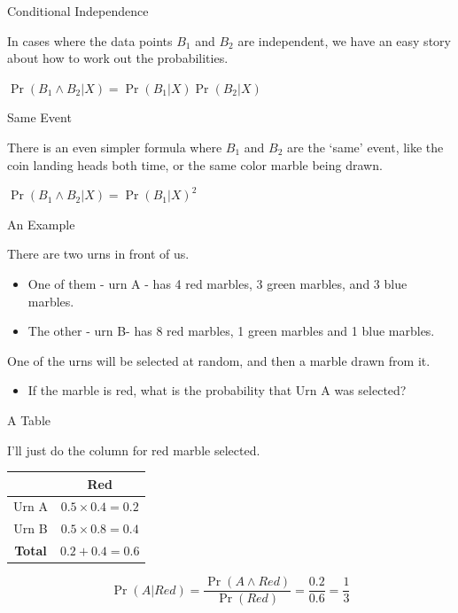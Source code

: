 \documentclass[
  ignorenonframetext,
]{beamer}
\providecommand{\tightlist}{%
  \setlength{\itemsep}{0pt}\setlength{\parskip}{0pt}}
\renewcommand{\,}{\text{, }}
\renewenvironment*{quote}	
	{\list{}{\rightmargin   \leftmargin} \item } 	
	{\endlist }
\begin{document}
\begin{frame}{Conditional Independence}
\protect\hypertarget{conditional-independence-1}{}

In cases where the data points \(B_1\) and \(B_2\) are independent, we
have an easy story about how to work out the probabilities.

\begin{quote}
\(\Pr(B_1 \wedge B_2 | X) = \Pr(B_1 | X)\Pr(B_2 | X)\)
\end{quote}

\end{frame}

\begin{frame}{Same Event}
\protect\hypertarget{same-event}{}

There is an even simpler formula where \(B_1\) and \(B_2\) are the
`same' event, like the coin landing heads both time, or the same color
marble being drawn.

\begin{quote}
\(\Pr(B_1 \wedge B_2 | X) = \Pr(B_1 | X)^2\)
\end{quote}

\end{frame}

\begin{frame}{An Example}
\protect\hypertarget{an-example}{}

There are two urns in front of us.

\begin{itemize}
\tightlist
\item
  One of them - urn A - has 4 red marbles, 3 green marbles, and 3 blue
  marbles.
\item
  The other - urn B- has 8 red marbles, 1 green marbles and 1 blue
  marbles. \pause
\end{itemize}

One of the urns will be selected at random, and then a marble drawn from
it.

\begin{itemize}
\tightlist
\item
  If the marble is red, what is the probability that Urn A was selected?
\end{itemize}

\end{frame}

\begin{frame}{A Table}
\protect\hypertarget{a-table}{}

I'll just do the column for red marble selected.

\begin{longtable}[]{@{}cc@{}}
\toprule
& Red\tabularnewline
\midrule
\endhead
Urn A & \(0.5 \times 0.4 = 0.2\)\tabularnewline
Urn B & \(0.5 \times 0.8 = 0.4\)\tabularnewline
\textbf{Total} & \(0.2 + 0.4 = 0.6\)\tabularnewline
\bottomrule
\end{longtable}

\pause

\[
\Pr(A | Red) = \frac{\Pr(A \wedge Red)}{\Pr(Red)} = \frac{0.2}{0.6} = \frac{1}{3}
\]

\end{frame}
\end{document}
